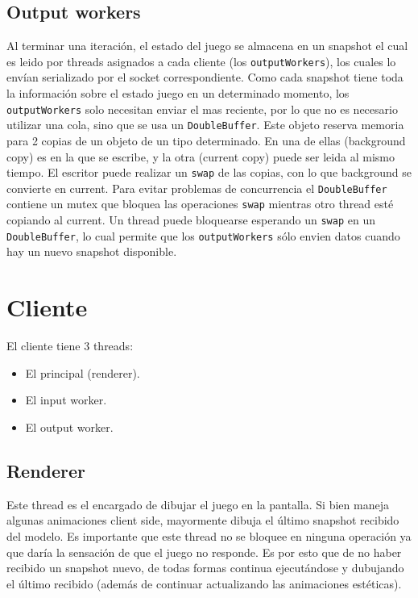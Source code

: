 \subsection{Output workers}

Al terminar una iteraci\'on, el estado del juego se almacena en un snapshot el cual es leido por threads
asignados a cada cliente (los \texttt{outputWorkers}), los cuales lo env\'ian serializado por el
socket correspondiente. Como cada snapshot tiene toda la informaci\'on sobre el estado juego
en un determinado momento, los \texttt{outputWorkers} solo necesitan enviar el mas reciente, por lo que no
es necesario utilizar una cola, sino que se usa un \texttt{DoubleBuffer}. Este objeto reserva memoria
para 2 copias de un objeto de un tipo determinado. En una de ellas (background copy) es en la que se escribe, y
la otra (current copy) puede ser leida al mismo tiempo. El escritor puede realizar un \texttt{swap} de las copias,
con lo que background se convierte en current. Para evitar problemas de concurrencia el \texttt{DoubleBuffer}
contiene un mutex que bloquea las operaciones \texttt{swap} mientras otro thread est\'e copiando al current.
Un thread puede bloquearse esperando un \texttt{swap} en un \texttt{DoubleBuffer}, lo cual permite que los
\texttt{outputWorkers} s\'olo envien datos cuando hay un nuevo snapshot disponible.


\section{Cliente}

El cliente tiene 3 threads:

\begin{itemize}
    \item El principal (renderer).
    \item El input worker.
    \item El output worker.
\end{itemize}


\subsection{Renderer}

Este thread es el encargado de dibujar el juego en la pantalla. Si bien maneja algunas animaciones client side,
mayormente dibuja el \'ultimo snapshot recibido del modelo. Es importante que este thread no se bloquee en ninguna
operaci\'on ya que dar\'ia la sensaci\'on de que el juego no responde. Es por esto que de no haber recibido un
snapshot nuevo, de todas formas continua ejecut\'andose y dubujando el \'ultimo recibido (adem\'as de continuar
actualizando las animaciones est\'eticas).

